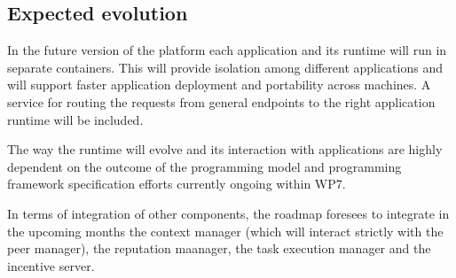 


\subsection{Expected evolution}

In the future version of the platform each application and its runtime will run in separate containers. This will provide isolation among different applications and will support faster application deployment and portability across machines. A service for routing the requests from general endpoints to the right application runtime will be included.

The way the runtime will evolve and its interaction with applications are highly dependent on the outcome of the programming model and programming framework specification efforts currently ongoing within WP7.

In terms of integration of other components, the roadmap foresees to integrate in the upcoming months the context manager (which will interact strictly with the peer manager), the reputation maanager, the task execution manager and the incentive server.